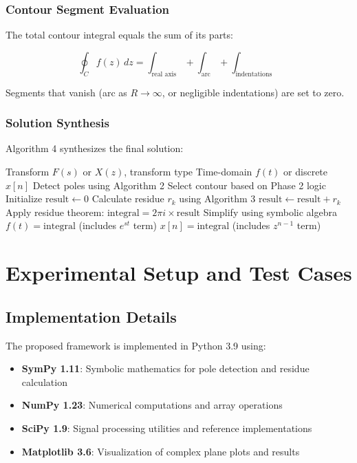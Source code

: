\documentclass[conference]{IEEEtran}
\begin{document}
\subsubsection{Contour Segment Evaluation}

The total contour integral equals the sum of its parts:

\begin{equation}
\oint_C f(z) \, dz = \int_{\text{real axis}} + \int_{\text{arc}} + \int_{\text{indentations}}
\end{equation}

Segments that vanish (arc as $R \to \infty$, or negligible indentations) are set to zero.

\subsubsection{Solution Synthesis}

Algorithm 4 synthesizes the final solution:

\begin{algorithm}[h]
\caption{Complete Inverse Transform Computation}
\begin{algorithmic}[1]
\REQUIRE Transform $F(s)$ or $X(z)$, transform type
\ENSURE Time-domain $f(t)$ or discrete $x[n]$
\STATE Detect poles using Algorithm 2
\STATE Select contour based on Phase 2 logic
\STATE Initialize $\text{result} \gets 0$
    \STATE Calculate residue $r_k$ using Algorithm 3
    \STATE $\text{result} \gets \text{result} + r_k$
\ENDFOR
\STATE Apply residue theorem: $\text{integral} = 2\pi i \times \text{result}$
\STATE Simplify using symbolic algebra
    \RETURN $f(t) = \text{integral}$ (includes $e^{st}$ term)
    \RETURN $x[n] = \text{integral}$ (includes $z^{n-1}$ term)
\ENDIF
\end{algorithmic}
\end{algorithm}

\section{Experimental Setup and Test Cases}

\subsection{Implementation Details}

The proposed framework is implemented in Python 3.9 using:
\begin{itemize}
    \item \textbf{SymPy 1.11}: Symbolic mathematics for pole detection and residue calculation
    \item \textbf{NumPy 1.23}: Numerical computations and array operations
    \item \textbf{SciPy 1.9}: Signal processing utilities and reference implementations
    \item \textbf{Matplotlib 3.6}: Visualization of complex plane plots and results
\end{itemize}
\end{document}
